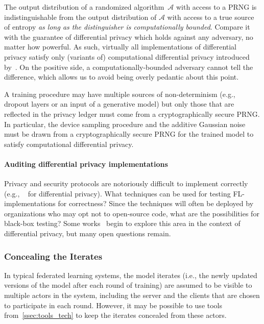 \documentclass[11pt]{article}
\begin{document}
The output distribution of a randomized algorithm~$\mathcal{A}$ with access to a PRNG is indistinguishable from the output distribution of $\mathcal{A}$ with access to a true source of entropy \emph{as long as the distinguisher is computationally bounded}. Compare it with the guarantee of differential privacy which holds against any adversary, no matter how powerful. As such, virtually all implementations of differential privacy satisfy only (variants of) computational differential privacy introduced by~\citep{Mironov-CDP}. On the positive side, a computationally-bounded adversary cannot tell the difference, which allows us to avoid being overly pedantic about this point.

A training procedure may have multiple sources of non-determinism (e.g., dropout layers or an input of a generative model) but only those that are reflected in the privacy ledger must come from a cryptographically secure PRNG. In particular, the device sampling procedure and the additive Gaussian noise must be drawn from a cryptographically secure PRNG for the trained model to satisfy computational differential privacy. 

\paragraph{Auditing differential privacy implementations}
Privacy and security protocols are notoriously difficult to implement correctly (e.g., ~\cite{mironov2012significance, haeberlen2011differential} for differential privacy). What techniques can be used for testing FL-implementations for correctness? Since the techniques will often be deployed by organizations who may opt not to open-source code, what are the possibilities for black-box testing?  Some works~\cite{ding2019detecting,liu2019minimax,jagielski2020auditing} begin to explore this area in the context of differential privacy, but many open questions remain.

\subsubsection{Concealing the Iterates}
\label{sssec:concealing_iterates}

In typical federated learning systems, the model iterates (i.e., the newly updated versions of the model after each round of training) are assumed to be visible to multiple actors in the system, including the server and the clients that are chosen to participate in each round.  However, it may be possible to use tools from~\cref{ssec:tools_tech} to keep the iterates concealed from these actors.
\end{document}
